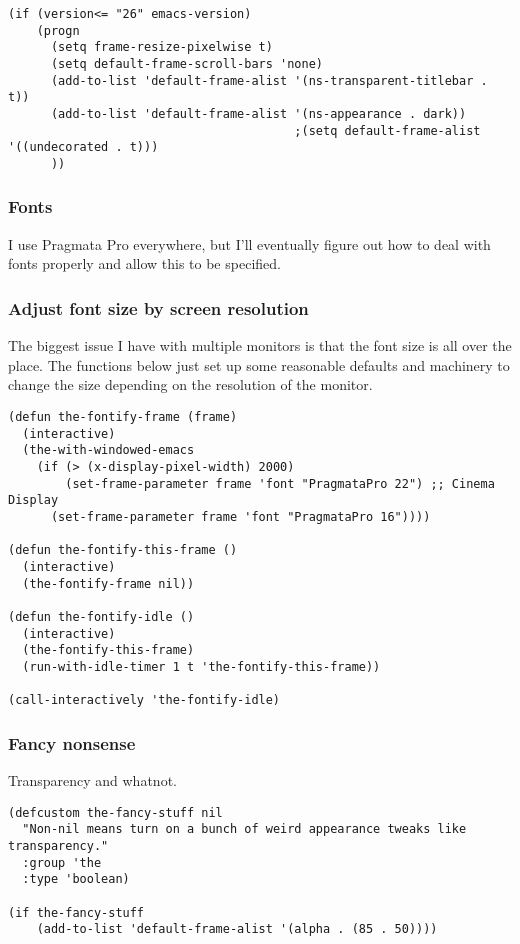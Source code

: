 \documentclass[11pt]{article}
\begin{document}
\begin{verbatim}
(if (version<= "26" emacs-version)
    (progn
      (setq frame-resize-pixelwise t)
      (setq default-frame-scroll-bars 'none)
      (add-to-list 'default-frame-alist '(ns-transparent-titlebar . t))
      (add-to-list 'default-frame-alist '(ns-appearance . dark))
                                        ;(setq default-frame-alist '((undecorated . t)))
      ))
\end{verbatim}

\subsubsection{Fonts}
\label{sec:org9bf597c}
I use Pragmata Pro everywhere, but I'll eventually figure out how to
deal with fonts properly and allow this to be specified.

\subsubsection{Adjust font size by screen resolution}
\label{sec:org6942863}
The biggest issue I have with multiple monitors is that the font size
is all over the place. The functions below just set up some reasonable
defaults and machinery to change the size depending on the resolution
of the monitor.

\begin{verbatim}
(defun the-fontify-frame (frame)
  (interactive)
  (the-with-windowed-emacs
    (if (> (x-display-pixel-width) 2000)
        (set-frame-parameter frame 'font "PragmataPro 22") ;; Cinema Display
      (set-frame-parameter frame 'font "PragmataPro 16"))))

(defun the-fontify-this-frame ()
  (interactive)
  (the-fontify-frame nil))

(defun the-fontify-idle ()
  (interactive)
  (the-fontify-this-frame)
  (run-with-idle-timer 1 t 'the-fontify-this-frame))

(call-interactively 'the-fontify-idle)
\end{verbatim}

\subsubsection{Fancy nonsense}
\label{sec:org84cef02}
Transparency and whatnot.
\begin{verbatim}
(defcustom the-fancy-stuff nil
  "Non-nil means turn on a bunch of weird appearance tweaks like
transparency."
  :group 'the
  :type 'boolean)

(if the-fancy-stuff
    (add-to-list 'default-frame-alist '(alpha . (85 . 50))))
\end{verbatim}
\end{document}
